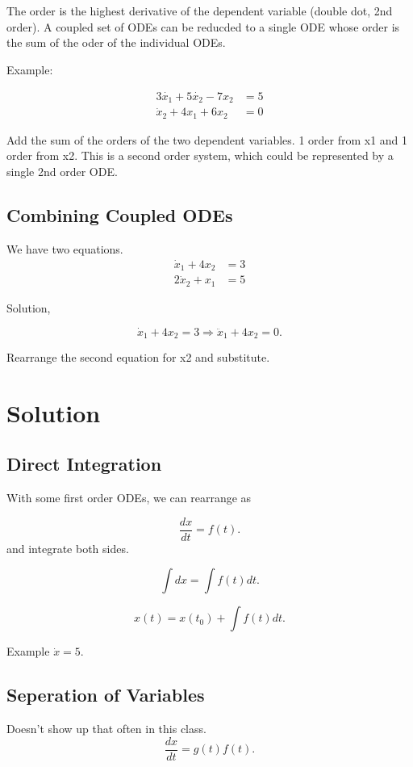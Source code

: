 \documentclass[12pt, a4paper]{report}
\begin{document}
    The order is the highest derivative of the dependent variable (double dot, 2nd order). A coupled set of ODEs can be reducded to a single ODE whose order is the sum of the oder of the individual ODEs.

    Example:

    \begin{align}
      3 \dot{x_1} + 5 \dot{x_2} - 7 x_2 &= 5 \\
      \dot x_2 + 4 x_1 + 6 x_2 &= 0
    \end{align}

    Add the sum of the orders of the two dependent variables. 1 order from x1 and 1 order from x2. This is a second order system, which could be represented by a single 2nd order ODE.

    \subsection{Combining Coupled ODEs}
    We have two equations.
    \begin{align}
      \dot x_1 + 4x_2 &= 3 \\
      2 \dot x_2 + x_1 &= 5
    \end{align}

    Solution,

    \[
        \dot x_1 + 4x_2 = 3 \Rightarrow \ddot x_1 + 4 x_2 = 0
      .\]

    Rearrange the second equation for x2 and substitute.

    \section{Solution}

    \subsection{Direct Integration}

    With some first order ODEs, we can rearrange as

    \[
        \frac{dx}{dt} = f(t)
      .\]
    and integrate both sides.

    \[
        \int{dx} = \int{f(t) dt}
      .\]

    \[
        x(t) = x(t_0) + \int{f(t)dt}
      .\]

    Example $ \dot x = 5. $

    \subsection{Seperation of Variables}
    Doesn't show up that often in this class.
    \[
        \frac{dx}{dt} = g(t) f(t)
      .\]
\end{document}
